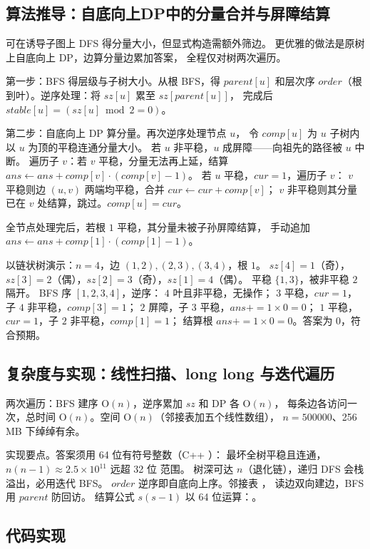 \subsection{算法推导：自底向上DP中的分量合并与屏障结算}

可在诱导子图上 DFS 得分量大小，但显式构造需额外筛边。
更优雅的做法是原树上自底向上 DP，边算分量边累加答案，
全程仅对树两次遍历。

第一步：BFS 得层级与子树大小。从根 BFS，得 $\mathit{parent}[u]$ 和层次序
$\mathit{order}$（根到叶）。逆序处理：将 $\mathit{sz}[u]$ 累至 $\mathit{sz}[\mathit{parent}[u]]$，
完成后 $\mathit{stable}[u]=(\mathit{sz}[u]\bmod2=0)$。

第二步：自底向上 DP 算分量。再次逆序处理节点 $u$，
令 $\mathit{comp}[u]$ 为 $u$ 子树内以 $u$ 为顶的平稳连通分量大小。
若 $u$ 非平稳，$u$ 成屏障——向祖先的路径被 $u$ 中断。
遍历子 $v$：若 $v$ 平稳，分量无法再上延，结算
$\mathit{ans}\gets\mathit{ans}+\mathit{comp}[v]\cdot(\mathit{comp}[v]-1)$。
若 $u$ 平稳，$\mathit{cur}=1$，遍历子 $v$：
$v$ 平稳则边 $(u,v)$ 两端均平稳，合并 $\mathit{cur}\gets\mathit{cur}+\mathit{comp}[v]$；
$v$ 非平稳则其分量已在 $v$ 处结算，跳过。$\mathit{comp}[u]=\mathit{cur}$。

全节点处理完后，若根 $1$ 平稳，其分量未被子孙屏障结算，
手动追加 $\mathit{ans}\gets\mathit{ans}+\mathit{comp}[1]\cdot(\mathit{comp}[1]-1)$。

以链状树演示：$n=4$，边 $(1,2),(2,3),(3,4)$，根 $1$。
$\mathit{sz}[4]=1$（奇），$\mathit{sz}[3]=2$（偶），$\mathit{sz}[2]=3$（奇），$\mathit{sz}[1]=4$（偶）。
平稳 $\{1,3\}$，被非平稳 $2$ 隔开。
BFS 序 $[1,2,3,4]$，逆序：
$4$ 叶且非平稳，无操作；
$3$ 平稳，$\mathit{cur}=1$，子 $4$ 非平稳，$\mathit{comp}[3]=1$；
$2$ 屏障，子 $3$ 平稳，$\mathit{ans}+=1\times0=0$；
$1$ 平稳，$\mathit{cur}=1$，子 $2$ 非平稳，$\mathit{comp}[1]=1$；
结算根 $\mathit{ans}+=1\times0=0$。答案为 $0$，符合预期。

\subsection{复杂度与实现：线性扫描、long long 与迭代遍历}

两次遍历：BFS 建序 $\mathrm{O}(n)$，逆序累加 $\mathit{sz}$ 和 DP 各 $\mathrm{O}(n)$，
每条边各访问一次，总时间 $\mathrm{O}(n)$。空间 $\mathrm{O}(n)$（邻接表加五个线性数组），
$n=500000$、256 MB 下绰绰有余。

实现要点。答案须用 64 位有符号整数（C++ ）：
最坏全树平稳且连通，$n(n-1)\approx2.5\times10^{11}$ 远超 32 位  范围。
树深可达 $n$（退化链），递归 DFS 会栈溢出，必用迭代 BFS。
$\mathit{order}$ 逆序即自底向上序。邻接表 ，
读边双向建边，BFS 用 $\mathit{parent}$ 防回访。
结算公式 $s(s-1)$ 以 64 位运算：。

\subsection{代码实现}
\inputminted{c++}{../src/p04_safe_paths.cpp}
